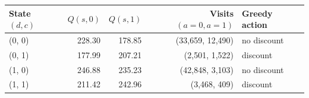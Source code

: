 \begin{tabular}{lrrrl}
\toprule
State $(d, c)$ & $Q(s, 0)$ & $Q(s, 1)$ & Visits $(a{=}0, a{=}1)$ & Greedy action \\
\midrule
(0, 0) & 228.30 & 178.85 & (33,659, 12,490) & no discount \\
(0, 1) & 177.99 & 207.21 & (2,501, 1,522) & discount \\
(1, 0) & 246.88 & 235.23 & (42,848, 3,103) & no discount \\
(1, 1) & 211.42 & 242.96 & (3,468, 409) & discount \\
\bottomrule
\end{tabular}

